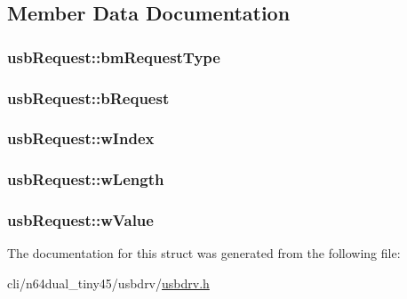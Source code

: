 \subsection{Member Data Documentation}
\hypertarget{structusbRequest_a05c2e0d9ac30dce558bcd69a692314c0}{
\subsubsection[{bm\-Request\-Type}]{ usb\-Request\-::bm\-Request\-Type}}\label{structusbRequest_a05c2e0d9ac30dce558bcd69a692314c0}
\hypertarget{structusbRequest_a34c18b1dd0af60774cac48b176220c2c}{
\subsubsection[{b\-Request}]{ usb\-Request\-::b\-Request}}\label{structusbRequest_a34c18b1dd0af60774cac48b176220c2c}
\hypertarget{structusbRequest_aefa059246bf079d5b42af148a2ad6a95}{
\subsubsection[{w\-Index}]{ usb\-Request\-::w\-Index}}\label{structusbRequest_aefa059246bf079d5b42af148a2ad6a95}
\hypertarget{structusbRequest_a770437881c2e37d1384982fe26d87e7f}{
\subsubsection[{w\-Length}]{ usb\-Request\-::w\-Length}}\label{structusbRequest_a770437881c2e37d1384982fe26d87e7f}
\hypertarget{structusbRequest_ab3f8687bb757c53ed03c3ce4310dc5c5}{
\subsubsection[{w\-Value}]{ usb\-Request\-::w\-Value}}\label{structusbRequest_ab3f8687bb757c53ed03c3ce4310dc5c5}


The documentation for this struct was generated from the following file\-:\begin{DoxyCompactItemize}
\item 
cli/n64dual\-\_\-tiny45/usbdrv/\hyperlink{usbdrv_8h}{usbdrv.\-h}\end{DoxyCompactItemize}
